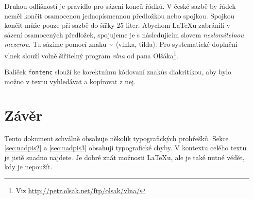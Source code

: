 \documentclass[10pt, a4paper, twocolumn]{article}
\begin{document}
\indent Druhou odlišností je pravidlo pro sázení konců řádků. V české sazbě by řádek neměl končit osamocenou jednopísmennou předložkou nebo spojkou. Spojkou  končit může pouze při sazbě do šířky 25 liter. Abychom \LaTeX u zabránili v sázení osamocených předložek, spojujeme je s následujícím slovem \emph{nezlomitelnou mezerou}. Tu sázíme pomocí znaku \textasciitilde\ (vlnka, tilda). Pro systematické doplnění vlnek slouží volně šiřitelný program \emph{vlna} od pana Olšáka\footnote{Viz \url{http://petr.olsak.net/ftp/olsak/vlna/}}.\par

\indent Balíček \verb|fontenc| slouží ke korektnímu kódovaní znaků\linebreak s diakritikou, aby bylo možno v textu vyhledávat a kopírovat z nej.

\section{Závěr}

Tento dokument schválně obsahuje několik typografických prohřešků. Sekce \ref{sec:nadpis2} a \ref{sec:nadpis3} obsahují typografické chyby. V kontextu celého textu je jistě snadno najdete. Je dobré znát možnosti \LaTeX u, ale je také nutné vědět, kdy je nepoužít.
\end{document}
